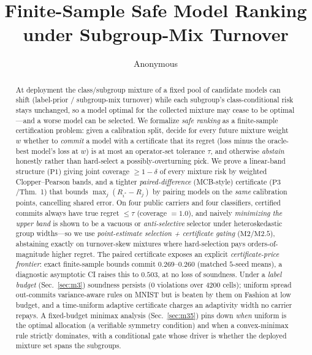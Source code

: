 \documentclass{article}
\title{Finite-Sample Safe Model Ranking under Subgroup-Mix Turnover}
\author{Anonymous}
\date{}
\begin{document}
\maketitle

\begin{abstract}
At deployment the class/subgroup mixture of a fixed pool of candidate models can shift
(label-prior / subgroup-mix turnover) while each subgroup's class-conditional risk stays
unchanged, so a model optimal for the collected mixture may cease to be optimal---and a
worse model can be selected. We formalize \emph{safe ranking} as a finite-sample
certification problem: given a calibration split, decide for every future mixture weight $w$
whether to \emph{commit} a model with a certificate that its regret (loss minus the
oracle-best model's loss at $w$) is at most an operator-set tolerance $\tau$, and otherwise
\emph{abstain} honestly rather than hard-select a possibly-overturning pick. We prove a
linear-band structure ($\mathrm{P1}$) giving joint coverage $\ge1-\delta$ of every mixture
risk by weighted Clopper--Pearson bands, and a tighter \emph{paired-difference} (MCB-style)
certificate ($\mathrm{P3}$/Thm.~1) that bounds $\max_j(R_{i^*}-R_j)$ by pairing models on the
\emph{same} calibration points, cancelling shared error. On four public carriers and four
classifiers, certified commits always have true regret $\le\tau$ (coverage $=1.0$), and
naively \emph{minimizing the upper band} is shown to be a vacuous or \emph{anti-selective}
selector under heteroskedastic group widths---so we use \emph{point-estimate selection +
certificate gating} ($\mathrm{M2}$/$\mathrm{M2.5}$), abstaining exactly on turnover-skew
mixtures where hard-selection pays orders-of-magnitude higher regret. The paired certificate
exposes an explicit \emph{certificate-price frontier}: exact finite-sample bounds commit
$0.269$--$0.260$ (matched $5$-seed means), a diagnostic asymptotic CI raises this to $0.503$,
at no loss of soundness.
Under a \emph{label budget} (Sec.~\ref{sec:m3}) soundness persists (0 violations over 4200
cells); uniform spread out-commits variance-aware rules on MNIST but is beaten by them on
Fashion at low budget, and a time-uniform adaptive certificate charges an adaptivity width no
carrier repays. A fixed-budget minimax analysis (Sec.~\ref{sec:m35}) pins down \emph{when}
uniform is the optimal allocation (a verifiable symmetry condition) and when a convex-minimax
rule strictly dominates, with a conditional gate whose driver is whether the deployed mixture
set spans the subgroups.
\end{abstract}
\end{document}

